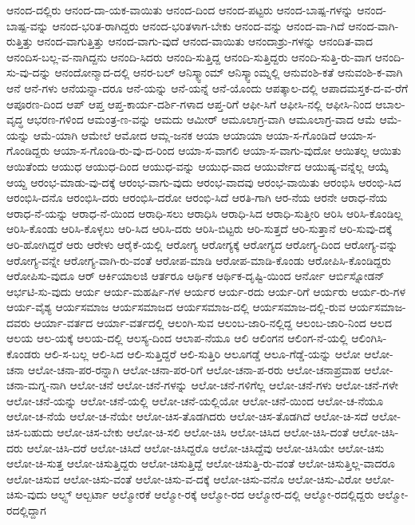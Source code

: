 {ಆನಂದ-ದಲ್ಲಿರು
ಆನಂದ-ದಾ-ಯಕ-ವಾಯಿತು
ಆನಂದ-ದಿಂದ
ಆನಂದ-ಪಟ್ಟರು
ಆನಂದ-ಬಾಷ್ಪ-ಗಳನ್ನು
ಆನಂದ-ಬಾಷ್ಪ-ವನ್ನು
ಆನಂದ-ಭರಿತ-ರಾಗಿದ್ದರು
ಆನಂದ-ಭರಿತಳಾಗ-ಬೇಕು
ಆನಂದ-ವನ್ನು
ಆನಂದ-ವಾ-ಗಿದೆ
ಆನಂದ-ವಾಗಿ-ರುತ್ತಿತ್ತು
ಆನಂದ-ವಾಗುತ್ತಿತ್ತು
ಆನಂದ-ವಾಗು-ವುದೆ
ಆನಂದ-ವಾಯಿತು
ಆನಂದಾಶ್ರು-ಗಳನ್ನು
ಆನಂದಿತ-ವಾದ
ಆನಂದಿಸ-ಬಲ್ಲ-ವ-ನಾಗಿದ್ದನು
ಆನಂದಿ-ಸಿದರು
ಆನಂದಿ-ಸುತ್ತಿದ್ದ
ಆನಂದಿ-ಸುತ್ತಿದ್ದರು
ಆನಂದಿ-ಸುತ್ತಿ-ರು-ವಾಗ
ಆನಂದಿ-ಸು-ವು-ದನ್ನು
ಆನಂದೋನ್ಮಾದ-ದಲ್ಲಿ
ಆನರ-ಬಲ್
ಆನಿಸ್ಕ್ವಾಂಮ್
ಆನಿಸ್ಕ್ವಾಂಮ್ನಲ್ಲಿ
ಆನುವಂಶಿ-ಕತೆ
ಆನುವಂಶಿ-ಕ-ವಾಗಿ
ಆನೆ
ಆನೆ-ಗಳು
ಆನೆಯನ್ನಾ-ದರೂ
ಆನೆ-ಯನ್ನು
ಆನೆ-ಯನ್ನೆ
ಆನೆ-ಯೊಂದು
ಆಪತ್ಕಾಲ-ದಲ್ಲಿ
ಆಪಾದಮಸ್ತಕ-ದ-ವ-ರೆಗೆ
ಆಪೂರಣ-ದಿಂದ
ಆಪ್
ಆಪ್ತ
ಆಪ್ತ-ಕಾರ್ಯ-ದರ್ಶಿ-ಗಳಾದ
ಆಪ್ತ-ರಿಗೆ
ಆಫೀ-ಸಿಗೆ
ಆಫೀಸಿ-ನಲ್ಲಿ
ಆಫೀಸಿ-ನಿಂದ
ಆಬಾಲ-ವೃದ್ಧ
ಆಭರಣ-ಗಳಿಂದ
ಆಮಂತ್ರ-ಣ-ವನ್ನು
ಆಮದು
ಆಮೀರ್
ಆಮೂಲಾಗ್ರ-ವಾಗಿ
ಆಮೂಲಾಗ್ರ-ವಾದ
ಆಮೆ
ಆಮೆ-ಯನ್ನು
ಆಮೆ-ಯಾಗಿ
ಆಮೇಲೆ
ಆಮೋದ
ಆಮ್ಲ-ಜನಕ
ಆಯಾ
ಆಯಾಯಾ
ಆಯಾ-ಸ-ಗೊಂಡಿದೆ
ಆಯಾ-ಸ-ಗೊಂಡಿದ್ದರು
ಆಯಾ-ಸ-ಗೊಂಡಿ-ರು-ವು-ದ-ರಿಂದ
ಆಯಾ-ಸ-ವಾಗಲಿ
ಆಯಾ-ಸ-ವಾಗು-ವುದೋ
ಆಯಿತಲ್ಲ
ಆಯಿತು
ಆಯಿತೆಂದು
ಆಯುಧ
ಆಯುಧ-ದಿಂದ
ಆಯುಧ-ವನ್ನು
ಆಯುಧ-ವಾದ
ಆಯುರ್ವೇದ
ಆಯುಷ್ಯ-ವನ್ನೆಲ್ಲ
ಆಯ್ಕೆ
ಆಯ್ದ
ಆರಂಭ-ಮಾಡು-ವು-ದಕ್ಕೆ
ಆರಂಭ-ವಾಗು-ವುದು
ಆರಂಭ-ವಾದವು
ಆರಂಭ-ವಾಯಿತು
ಆರಂಭಿಸಿ
ಆರಂಭಿ-ಸಿದ
ಆರಂಭಿಸಿ-ದನೊ
ಆರಂಭಿಸಿ-ದರು
ಆರಂಭಿಸಿ-ದರೋ
ಆರಂಭಿ-ಸಿದೆ
ಆರತಿ-ಗಾಗಿ
ಆರ-ನೆಯ
ಆರನೇ
ಆರಾಧ-ನೆಯ
ಆರಾಧ-ನೆ-ಯನ್ನು
ಆರಾಧ-ನೆ-ಯಿಂದ
ಆರಾಧಿ-ಸಲು
ಆರಾಧಿಸಿ
ಆರಾಧಿ-ಸಿದ
ಆರಾಧಿ-ಸುತ್ತೀರಿ
ಆರಿಸಿ
ಆರಿಸಿ-ಕೊಂಡಿಲ್ಲ
ಆರಿಸಿ-ಕೊಂಡು
ಆರಿಸಿ-ಕೊಳ್ಳಲು
ಆರಿ-ಸಿದ
ಆರಿಸಿ-ದರು
ಆರಿಸಿ-ಬಿಟ್ಟರು
ಆರಿ-ಸುತ್ತದೆ
ಆರಿ-ಸುತ್ತಾನೆ
ಆರಿ-ಸುವು-ದಕ್ಕೆ
ಆರಿ-ಹೋಗಿದ್ದರೆ
ಆರು
ಆರೇಳು
ಆರೈಕೆ-ಯಲ್ಲಿ
ಆರೋಗ್ಯ
ಆರೋಗ್ಯಕ್ಕೆ
ಆರೋಗ್ಯದ
ಆರೋಗ್ಯ-ದಿಂದ
ಆರೋಗ್ಯ-ವನ್ನು
ಆರೋಗ್ಯ-ವನ್ನೇ
ಆರೋಗ್ಯ-ವಾಗಿ-ರು-ವಂತೆ
ಆರೋಪ-ಮಾಡಿ
ಆರೋಪ-ಮಾಡಿ-ಕೊಂಡು
ಆರೋಪಿಸಿ-ಕೊಂಡಿದ್ದರು
ಆರೋಪಿಸು-ವುದೂ
ಆರ್
ಆರ್ಕಿಯಾಲಜಿ
ಆರ್ತರೂ
ಆರ್ಥಿಕ
ಆರ್ಥಿಕ-ದೃಷ್ಟಿ-ಯಿಂದ
ಆರ್ನೋ
ಆರ್ಬಿಸ್ನೋಡನ್
ಆರ್ಭಟಿ-ಸು-ವುದು
ಆರ್ಯ
ಆರ್ಯ-ಮಹರ್ಷಿ-ಗಳ
ಆರ್ಯರ
ಆರ್ಯ-ರದು
ಆರ್ಯ-ರಿಗೆ
ಆರ್ಯರು
ಆರ್ಯ-ರು-ಗಳ
ಆರ್ಯ-ವೈಶ್ಯ
ಆರ್ಯಸಮಾಜ
ಆರ್ಯಸಮಾಜದ
ಆರ್ಯಸಮಾಜ-ದಲ್ಲಿ
ಆರ್ಯಸಮಾಜ-ದಲ್ಲಿ-ರುವ
ಆರ್ಯಸಮಾಜ-ದವರು
ಆರ್ಯಾ-ವರ್ತದ
ಆರ್ಯಾ-ವರ್ತದಲ್ಲಿ
ಆಲಂಗಿ-ಸುವ
ಆಲಂಬ-ಜಾರಿ-ನಲ್ಲಿದ್ದ
ಆಲಂಬ-ಜಾರಿ-ನಿಂದ
ಆಲದ
ಆಲಯ
ಆಲ-ಯಕ್ಕೆ
ಆಲಯ-ದಲ್ಲಿ
ಆಲಸ್ಯ-ದಿಂದ
ಆಲಾಪ-ನೆಯೂ
ಆಲಿ
ಆಲಿಂಗನ
ಆಲಿಂಗ-ನೆ-ಯಲ್ಲಿ
ಆಲಿಂಗಿಸಿ-ಕೊಂಡರು
ಆಲಿ-ಸ-ಬಲ್ಲ
ಆಲಿ-ಸಿದ
ಆಲಿ-ಸುತ್ತಿದ್ದರೆ
ಆಲಿ-ಸುತ್ತಿರಿ
ಆಲೂಗಡ್ಡೆ
ಆಲೂ-ಗೆಡ್ಡೆ-ಯನ್ನು
ಆಲೋ
ಆಲೋ-ಚನಾ
ಆಲೋ-ಚನಾ-ಪರ-ರನ್ನಾಗಿ
ಆಲೋ-ಚನಾ-ಪರ-ರಿಗೆ
ಆಲೋ-ಚನಾ-ಪ-ರರು
ಆಲೋ-ಚನಾಪ್ರವಾಹ
ಆಲೋ-ಚನಾ-ಮಗ್ನ-ನಾಗಿ
ಆಲೋ-ಚನೆ
ಆಲೋ-ಚನೆ-ಗಳನ್ನು
ಆಲೋ-ಚನೆ-ಗಳಿಗೆಲ್ಲ
ಆಲೋ-ಚನೆ-ಗಳು
ಆಲೋ-ಚನೆ-ಗಳೇ
ಆಲೋ-ಚನೆ-ಯನ್ನು
ಆಲೋ-ಚನೆ-ಯಲ್ಲಿ
ಆಲೋ-ಚನೆ-ಯಲ್ಲಿಯೋ
ಆಲೋ-ಚನೆ-ಯಿಂದ
ಆಲೋ-ಚ-ನೆಯೂ
ಆಲೋ-ಚ-ನೆಯೆ
ಆಲೋ-ಚ-ನೆಯೇ
ಆಲೋ-ಚಿಸ-ತೊಡಗಿದರು
ಆಲೋ-ಚಿಸ-ತೊಡಗಿದೆ
ಆಲೋ-ಚಿ-ಸದೆ
ಆಲೋ-ಚಿಸ-ಬಹುದು
ಆಲೋ-ಚಿಸ-ಬೇಕು
ಆಲೋ-ಚಿ-ಸಲಿ
ಆಲೋ-ಚಿಸಿ
ಆಲೋ-ಚಿಸಿದ
ಆಲೋ-ಚಿಸಿ-ದಂತೆ
ಆಲೋ-ಚಿಸಿ-ದರು
ಆಲೋ-ಚಿಸಿ-ದರೆ
ಆಲೋ-ಚಿಸಿದೆ
ಆಲೋ-ಚಿಸಿದ್ದರೊ
ಆಲೋ-ಚಿಸಿದ್ದೆವು
ಆಲೋ-ಚಿಸಿಯೇ
ಆಲೋ-ಚಿಸು
ಆಲೋ-ಚಿ-ಸುತ್ತ
ಆಲೋ-ಚಿಸುತ್ತಿದ್ದರು
ಆಲೋ-ಚಿಸುತ್ತಿದ್ದೆ
ಆಲೋ-ಚಿಸುತ್ತಿ-ರು-ವಂತೆ
ಆಲೋ-ಚಿಸುತ್ತಿಲ್ಲ-ವಾದರೂ
ಆಲೋ-ಚಿಸುವ
ಆಲೋ-ಚಿಸು-ವಂತೆ
ಆಲೋ-ಚಿಸು-ವ-ದಕ್ಕೆ
ಆಲೋ-ಚಿಸು-ವನೊ
ಆಲೋ-ಚಿಸು-ವಿರೋ
ಆಲೋ-ಚಿಸು-ವುದು
ಆಲ್ಫ್ಸ್
ಆಲ್ಬರ್ಟಾ
ಆಲ್ಮೋರಕೆ
ಆಲ್ಮೋ-ರಕ್ಕೆ
ಆಲ್ಮೋ-ರದ
ಆಲ್ಮೋರ-ದಲ್ಲಿ
ಆಲ್ಮೋ-ರದಲ್ಲಿದ್ದರು
ಆಲ್ಮೋ-ರದಲ್ಲಿದ್ದಾಗ
}
